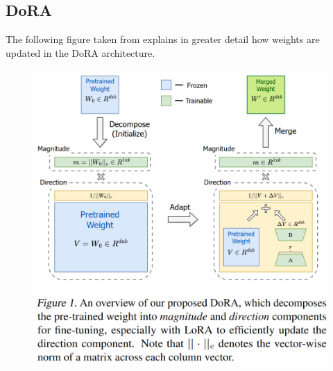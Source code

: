 \documentclass[11pt]{article} %
\begin{document}
\medskip
\printbibliography

\newpage

\begin{appendices}
    \section{DoRA}\label{appendix:dora}
    The following figure taken from \cite{dora} explains in greater detail how weights are updated in the DoRA architecture.
    \begin{figure}[H]
        \centering
        \includegraphics[scale=0.6]{dora_diagram.png}
    \end{figure}
    

\end{appendices}
\end{document}
